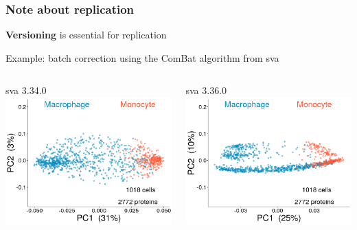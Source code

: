 \documentclass{beamer}
\newcommand{\hcode}[2][lgray]{{\ttfamily\color{vdgray}\colorbox{#1}{#2}}}
\newcommand{\frametitlesection}[1]{\frametitle{\centering #1 \footnotesize \hspace{0pt plus 1 filll} \insertsection}}
\begin{document}
\begin{frame}
    \frametitlesection{Note about replication }
    
    \textbf{Versioning} is essential for replication
    
    Example: batch correction using the \hcode{ComBat} algorithm from \hcode{sva}
    
    \bigskip 
    
    \scriptsize
    \centering
    \begin{columns}
        \begin{column}{0.5\textwidth}
            \hcode{sva 3.34.0}
            \includegraphics[width=\textwidth]{figs/CombatOld.png}
        \end{column}
        \begin{column}{0.5\textwidth}
            \hcode{sva 3.36.0}
            \includegraphics[width=\textwidth]{figs/CombatNew.png}
        \end{column}
    \end{columns}
    
\end{frame}
\end{document}
